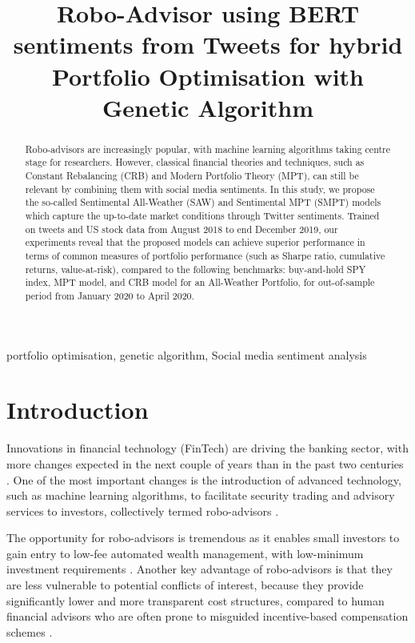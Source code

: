 \documentclass{article}
\title{Robo-Advisor using BERT sentiments from Tweets for hybrid Portfolio Optimisation with Genetic Algorithm}
\begin{document}
%
\maketitle
%
\begin{abstract}

Robo-advisors are increasingly popular, with machine learning algorithms taking centre stage for researchers. However, classical financial theories and techniques, such as Constant Rebalancing (CRB) and Modern Portfolio Theory (MPT), can still be relevant by combining them with social media sentiments. In this study, we propose the so-called Sentimental All-Weather (SAW) and Sentimental MPT (SMPT) models which capture the up-to-date market conditions through Twitter sentiments. Trained on tweets and US stock data from August 2018 to end December 2019, our experiments reveal that the proposed models can achieve superior performance in terms of common measures of portfolio performance (such as Sharpe ratio, cumulative returns, value-at-risk), compared to the following benchmarks: buy-and-hold SPY index, MPT model, and CRB model for an All-Weather Portfolio, for out-of-sample period from January 2020 to April 2020.

\end{abstract}
%
\begin{keywords}
portfolio optimisation, genetic algorithm, Social media sentiment analysis
\end{keywords}
%
\section{Introduction}

Innovations in financial technology (FinTech) are driving the banking sector, with more changes expected in the next couple of years than in the past two centuries \cite{morechanges10}. One of the most important changes is the introduction of advanced technology, such as machine learning algorithms, to facilitate security trading and advisory services to investors, collectively termed robo-advisors \cite{roboadvisors_wealth}.

The opportunity for robo-advisors is tremendous as it enables small investors to gain entry to low-fee automated wealth management, with low-minimum investment requirements \cite{rise_robo}. Another key advantage of robo-advisors is that they are less vulnerable to potential conflicts of interest, because they provide significantly lower and more transparent cost structures, compared to human financial advisors who are often prone to misguided incentive-based compensation schemes \cite{BRENNER2020100275}.
\end{document}
